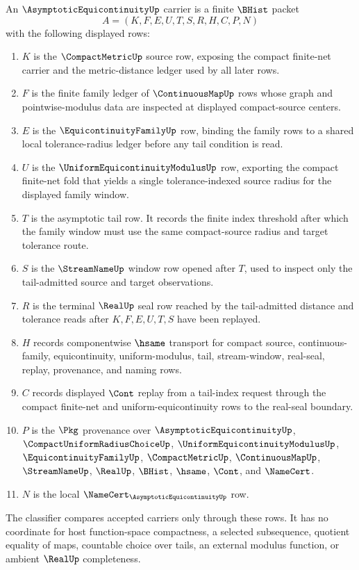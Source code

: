 \begin{definition}
\label{def:asymptotic-equicontinuity-carrier}
An $\AsymptoticEquicontinuityUp$ carrier is a finite $\BHist$ packet
$$
A=(K,F,E,U,T,S,R,H,C,P,N)
$$
with the following displayed rows:
\begin{enumerate}
\item $K$ is the $\CompactMetricUp$ source row, exposing the compact finite-net carrier and the metric-distance ledger used by all later rows.
\item $F$ is the finite family ledger of $\ContinuousMapUp$ rows whose graph and pointwise-modulus data are inspected at displayed compact-source centers.
\item $E$ is the $\EquicontinuityFamilyUp$ row, binding the family rows to a shared local tolerance-radius ledger before any tail condition is read.
\item $U$ is the $\UniformEquicontinuityModulusUp$ row, exporting the compact finite-net fold that yields a single tolerance-indexed source radius for the displayed family window.
\item $T$ is the asymptotic tail row. It records the finite index threshold after which the family window must use the same compact-source radius and target tolerance route.
\item $S$ is the $\StreamNameUp$ window row opened after $T$, used to inspect only the tail-admitted source and target observations.
\item $R$ is the terminal $\RealUp$ seal row reached by the tail-admitted distance and tolerance reads after $K,F,E,U,T,S$ have been replayed.
\item $H$ records componentwise $\hsame$ transport for compact source, continuous-family, equicontinuity, uniform-modulus, tail, stream-window, real-seal, replay, provenance, and naming rows.
\item $C$ records displayed $\Cont$ replay from a tail-index request through the compact finite-net and uniform-equicontinuity rows to the real-seal boundary.
\item $P$ is the $\Pkg$ provenance over $\AsymptoticEquicontinuityUp$, $\CompactUniformRadiusChoiceUp$, $\UniformEquicontinuityModulusUp$, $\EquicontinuityFamilyUp$, $\CompactMetricUp$, $\ContinuousMapUp$, $\StreamNameUp$, $\RealUp$, $\BHist$, $\hsame$, $\Cont$, and $\NameCert$.
\item $N$ is the local $\NameCert_{\AsymptoticEquicontinuityUp}$ row.
\end{enumerate}
The classifier compares accepted carriers only through these rows. It has no coordinate for host function-space compactness, a selected subsequence, quotient equality of maps, countable choice over tails, an external modulus function, or ambient $\RealUp$ completeness.
\end{definition}

